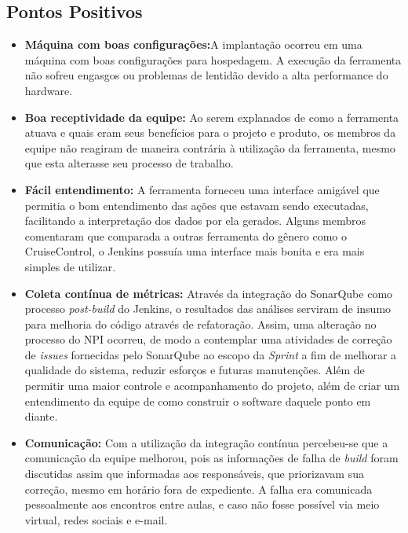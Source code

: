 \subsection{Pontos Positivos}
\begin{itemize}
\item \textbf{Máquina com boas configurações:}A implantação ocorreu em uma máquina com boas configurações para hospedagem. A execução da ferramenta não sofreu engasgos ou problemas de lentidão devido a alta performance do hardware.

\item \textbf{Boa receptividade da equipe:}
Ao serem explanados de como a ferramenta atuava e quais eram seus benefícios para o projeto e produto, os membros da equipe não reagiram de maneira contrária à utilização da ferramenta, mesmo que esta alterasse seu processo de trabalho.

\item \textbf{Fácil entendimento:}
A ferramenta forneceu uma interface amigável que permitia o bom entendimento das ações que estavam sendo executadas, facilitando a interpretação dos dados por ela gerados. Alguns membros comentaram que comparada a outras ferramenta do gênero como o CruiseControl, o Jenkins possuía uma interface mais bonita e era mais simples de utilizar.

\item \textbf{Coleta contínua de métricas:}
Através da integração do SonarQube como processo \textit{post-build} do Jenkins, o resultados das análises serviram de insumo para melhoria do código através de refatoração. Assim, uma alteração no processo do NPI ocorreu, de modo a contemplar uma atividades de correção de \textit{issues} fornecidas pelo SonarQube ao escopo da \textit{Sprint} a fim de melhorar a qualidade do sistema, reduzir esforços e futuras manutenções. Além de permitir uma maior controle e acompanhamento do projeto, além de criar um entendimento da equipe de como construir o software daquele ponto em diante.

\item \textbf{Comunicação:}
Com a utilização da integração contínua percebeu-se que a comunicação da equipe melhorou, pois as informações de falha de \textit{build} foram discutidas assim que informadas aos responsáveis, que priorizavam sua correção, mesmo em horário fora de expediente. A falha era comunicada pessoalmente aos encontros entre aulas, e caso não fosse possível via meio virtual, redes sociais e e-mail.

\end{itemize}
